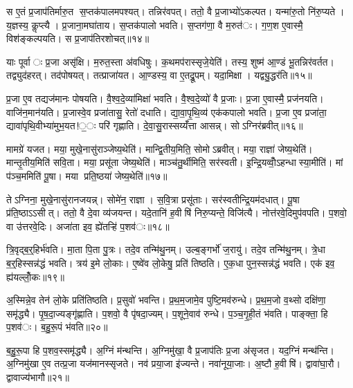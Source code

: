 स ए॒तं प्र॒जाप॑तिर्मारु॒त स॒प्तक॑पालमपश्यत्। तन्निर॑वपत्। ततो॒ वै प्र॒जाभ्यो॑ऽकल्पत। यन्मा॑रु॒तो नि॑रु॒प्यते। य॒ज्ञस्य॒ कॢप्त्यै। प्र॒जाना॒मघा॑ताय। स॒प्तक॑पालो भवति। स॒प्तग॑णा॒ वै म॒रुत॑ः। ग॒ण॒श ए॒वास्मै॒ विश॑ङ्कल्पयति। स प्र॒जाप॑तिरशोचत्॥१४॥

याः पूर्वाः प्र॒जा असृ॑क्षि। म॒रुत॒स्ता अ॑वधिषुः। क॒थमप॑रास्सृजे॒येति॑। तस्य॒ शुष्म॑ आ॒ण्डं भू॒तन्निर॑वर्तत। तद्व्युद॑हरत्। तद॑पोषयत्। तत्प्राजा॑यत। आ॒ण्डस्य॒ वा ए॒तद्रू॒पम्। यदा॒मिक्षा। यद्व्यु॒द्धर॑ति॥१५॥

प्र॒जा ए॒व तद्यज॑मानः पोषयति। वै॒श्व॒दे॒व्या॑मिक्षा॑ भवति। वै॒श्व॒दे॒व्यो॑ वै प्र॒जाः। प्र॒जा ए॒वास्मै॒ प्रज॑नयति। वाजि॑न॒मान॑यति। प्र॒जास्वे॒व प्रजा॑तासु॒ रेतो॑ दधाति। द्या॒वा॒पृ॒थि॒व्य॑ एक॑कपालो भवति। प्र॒जा ए॒व प्रजा॑ता॒ द्यावा॑पृथि॒वीभ्या॑मुभ॒यत!॒ः परि॑ गृह्णाति। दे॒वा॒सु॒रास्सय्यँ॑त्ता आसन्न्। सोऽग्निर॑ब्रवीत्॥१६॥

मामग्रे॑ यजत। मया॒ मुखे॒नासु॑राञ्जेष्य॒थेति॑। मान्द्वि॒तीय॒मिति॒ सोमोऽब्रवीत्। मया॒ राज्ञा॑ जेष्य॒थेति॑। मान्तृ॒तीय॒मिति॑ सवि॒ता। मया॒ प्रसू॑ता जेष्य॒थेति॑। माञ्च॑तु॒र्थीमिति॒ सर॑स्वती। इ॒न्द्रि॒यव्वोँ॒ऽहन्धास्या॒मीति॑। मां प॑ञ्च॒ममिति॑ पू॒षा। मया प्रति॒ष्ठया॑ जेष्य॒थेति॑॥१७॥

तेऽग्निना॒ मुखे॒नासु॑रानजयन्न्। सोमे॑न॒ राज्ञा। स॒वि॒त्रा प्रसू॑ताः। सर॑स्वतीन्द्रि॒यम॑दधात्। पू॒षा प्र॑ति॒ष्ठाऽऽसीत्। ततो॒ वै दे॒वा व्य॑जयन्त। यदे॒तानि॑ ह॒वीषि॑ निरु॒प्यन्ते॒ विजि॑त्यै। नोत्त॑रवे॒दिमुप॑वपति। प॒शवो॒ वा उ॑त्तरवे॒दिः। अजा॑ता इव॒ ह्ये॑तऱ्हि॑ प॒शव॑ः॥१८॥


त्रि॒वृद्ब॒र्॒हिर्भ॑वति। मा॒ता पि॒ता पु॒त्रः। तदे॒व तन्मि॑थु॒नम्। उल्ब॒ङ्गर्भो॑ ज॒रायु॑। तदे॒व तन्मि॑थु॒नम्। त्रे॒धा ब॒र्॒हिस्सन्न॑द्धं भवति। त्रय॑ इ॒मे लो॒काः। ए॒ष्वे॑व लो॒केषु॒ प्रति॑ तिष्ठति। ए॒क॒धा पुन॒स्सन्न॑द्धं भवति। एक॑ इव॒ ह्य॑यल्लोँ॒कः॥१९॥

अ॒स्मिन्ने॒व तेन॑ लो॒के प्रति॑तिष्ठति। प्र॒सुवो॑ भवन्ति। प्र॒थ॒म॒जामे॒व पुष्टि॒मव॑रुन्धे। प्र॒थ॒म॒जो व॒थ्सो दक्षि॑णा॒ समृ॑द्ध्यै। पृ॒ष॒दा॒ज्यङ्गृ॑ह्णाति। प॒शवो॒ वै पृ॑षदा॒ज्यम्। प॒शूने॒वाव॑ रुन्धे। प॒ञ्च॒गृ॒ही॒तं भ॑वति। पाङ्क्ता॒ हि प॒शव॑ः। ब॒हु॒रू॒पं भ॑वति॥२०॥

ब॒हु॒रू॒पा हि प॒शव॒स्समृ॑द्ध्यै। अ॒ग्निं म॑न्थन्ति। अ॒ग्निमु॑खा॒ वै प्र॒जाप॑तिः प्र॒जा अ॑सृजत। यद॒ग्निं मन्थ॑न्ति। अ॒ग्निमु॑खा ए॒व तत्प्र॒जा यज॑मानस्सृजते। नव॑ प्रया॒जा इ॑ज्यन्ते। नवा॑नूया॒जाः। अ॒ष्टौ ह॒वीषि॑। द्वावा॑घा॒रौ। द्वावाज्य॑भागौ॥२१॥

